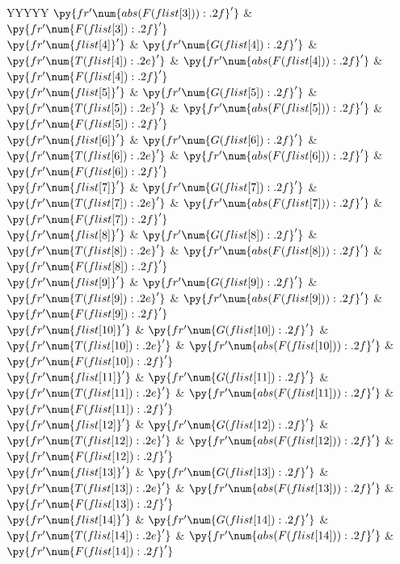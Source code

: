 \documentclass[../main/main.tex]{subfiles}
\begin{document}
{\begin{table}[htbp!]
\begin{tabularx}{\linewidth}{YYYYY}
			$\py{fr'\num{{{abs(F(flist[3])):.2f}}}'}$ &
			$\py{fr'\num{{{F(flist[3]):.2f}}}'}$
			\\
			$\py{fr'\num{{{flist[4]}}}'}$         &
			$\py{fr'\num{{{G(flist[4]):.2f}}}'}$      &
			$\py{fr'\num{{{T(flist[4]):.2e}}}'}$      &
			$\py{fr'\num{{{abs(F(flist[4])):.2f}}}'}$ &
			$\py{fr'\num{{{F(flist[4]):.2f}}}'}$
			\\
			$\py{fr'\num{{{flist[5]}}}'}$         &
			$\py{fr'\num{{{G(flist[5]):.2f}}}'}$      &
			$\py{fr'\num{{{T(flist[5]):.2e}}}'}$      &
			$\py{fr'\num{{{abs(F(flist[5])):.2f}}}'}$ &
			$\py{fr'\num{{{F(flist[5]):.2f}}}'}$
			\\
			$\py{fr'\num{{{flist[6]}}}'}$         &
			$\py{fr'\num{{{G(flist[6]):.2f}}}'}$      &
			$\py{fr'\num{{{T(flist[6]):.2e}}}'}$      &
			$\py{fr'\num{{{abs(F(flist[6])):.2f}}}'}$ &
			$\py{fr'\num{{{F(flist[6]):.2f}}}'}$
			\\
			$\py{fr'\num{{{flist[7]}}}'}$         &
			$\py{fr'\num{{{G(flist[7]):.2f}}}'}$      &
			$\py{fr'\num{{{T(flist[7]):.2e}}}'}$      &
			$\py{fr'\num{{{abs(F(flist[7])):.2f}}}'}$ &
			$\py{fr'\num{{{F(flist[7]):.2f}}}'}$
			\\
			$\py{fr'\num{{{flist[8]}}}'}$         &
			$\py{fr'\num{{{G(flist[8]):.2f}}}'}$      &
			$\py{fr'\num{{{T(flist[8]):.2e}}}'}$      &
			$\py{fr'\num{{{abs(F(flist[8])):.2f}}}'}$ &
			$\py{fr'\num{{{F(flist[8]):.2f}}}'}$
			\\
			$\py{fr'\num{{{flist[9]}}}'}$         &
			$\py{fr'\num{{{G(flist[9]):.2f}}}'}$      &
			$\py{fr'\num{{{T(flist[9]):.2e}}}'}$      &
			$\py{fr'\num{{{abs(F(flist[9])):.2f}}}'}$ &
			$\py{fr'\num{{{F(flist[9]):.2f}}}'}$
			\\
			$\py{fr'\num{{{flist[10]}}}'}$         &
			$\py{fr'\num{{{G(flist[10]):.2f}}}'}$      &
			$\py{fr'\num{{{T(flist[10]):.2e}}}'}$      &
			$\py{fr'\num{{{abs(F(flist[10])):.2f}}}'}$ &
			$\py{fr'\num{{{F(flist[10]):.2f}}}'}$
			\\
			$\py{fr'\num{{{flist[11]}}}'}$         &
			$\py{fr'\num{{{G(flist[11]):.2f}}}'}$      &
			$\py{fr'\num{{{T(flist[11]):.2e}}}'}$      &
			$\py{fr'\num{{{abs(F(flist[11])):.2f}}}'}$ &
			$\py{fr'\num{{{F(flist[11]):.2f}}}'}$
			\\
			$\py{fr'\num{{{flist[12]}}}'}$         &
			$\py{fr'\num{{{G(flist[12]):.2f}}}'}$      &
			$\py{fr'\num{{{T(flist[12]):.2e}}}'}$      &
			$\py{fr'\num{{{abs(F(flist[12])):.2f}}}'}$ &
			$\py{fr'\num{{{F(flist[12]):.2f}}}'}$
			\\
			$\py{fr'\num{{{flist[13]}}}'}$         &
			$\py{fr'\num{{{G(flist[13]):.2f}}}'}$      &
			$\py{fr'\num{{{T(flist[13]):.2e}}}'}$      &
			$\py{fr'\num{{{abs(F(flist[13])):.2f}}}'}$ &
			$\py{fr'\num{{{F(flist[13]):.2f}}}'}$
			\\
			$\py{fr'\num{{{flist[14]}}}'}$         &
			$\py{fr'\num{{{G(flist[14]):.2f}}}'}$      &
			$\py{fr'\num{{{T(flist[14]):.2e}}}'}$      &
			$\py{fr'\num{{{abs(F(flist[14])):.2f}}}'}$ &
			$\py{fr'\num{{{F(flist[14]):.2f}}}'}$
			\\
			\bottomrule
		\end{tabularx}
		\label{tab:ddb_corr}
	\end{table}

}
\end{document}
